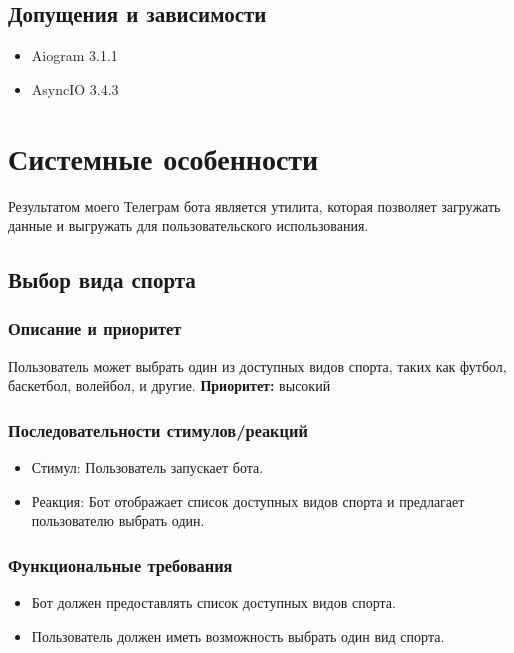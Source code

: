 \documentclass{scrreprt}
\begin{document}
\section{Допущения и зависимости}
\begin{itemize}
    \item Aiogram 3.1.1
    \item AsyncIO 3.4.3
\end{itemize}

\chapter{Системные особенности}
Результатом моего Телеграм бота является утилита, которая позволяет загружать данные и выгружать для пользовательского использования.

\section{Выбор вида спорта}

\subsection{Описание и приоритет}
Пользователь может выбрать один из доступных видов спорта, таких как футбол, баскетбол, волейбол, и другие.
\newline
\textbf{Приоритет:} высокий

\subsection{Последовательности стимулов/реакций}
\begin{itemize}
    \item Стимул: Пользователь запускает бота.
    \item Реакция: Бот отображает список доступных видов спорта и предлагает пользователю выбрать один.
\end{itemize}

\subsection{Функциональные требования}
\begin{itemize}
    \item Бот должен предоставлять список доступных видов спорта.
    \item Пользователь должен иметь возможность выбрать один вид спорта.
\end{itemize}
\end{document}
